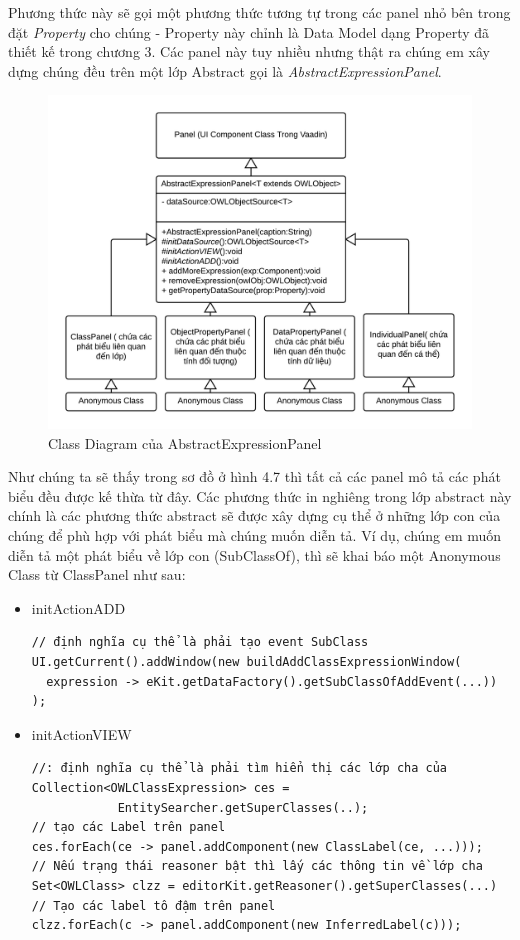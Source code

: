 Phương thức này sẽ gọi một phương thức tương tự trong các panel nhỏ bên trong đặt \textit{Property} cho chúng - Property này chỉnh là Data Model dạng Property đã thiết kế trong chương 3. Các panel này tuy nhiều nhưng thật ra chúng em xây dựng chúng đều trên một lớp Abstract gọi là \textit{AbstractExpressionPanel}.
\begin{figure}[h!]
	\centering
	\includegraphics[width=155mm]{Figures/uml_owleditor_abstractpanel_nobackground.png}
	\caption{Class Diagram của AbstractExpressionPanel\label{overflow}}
\end{figure}
Như chúng ta sẽ thấy trong sơ đồ ở hình 4.7 thì tất cả các panel mô tả các phát biểu đều được kế thừa từ đây. Các phương thức in nghiêng trong lớp abstract này chính là các phương thức abstract sẽ được xây dựng cụ thể ở những lớp con của chúng để phù hợp với phát biểu mà chúng muốn diễn tả. Ví dụ, chúng em muốn diễn tả một phát biểu về lớp con (SubClassOf), thì sẽ khai báo một Anonymous Class từ ClassPanel như sau:
\begin{itemize}
\item initActionADD
\begin{verbatim}
// định nghĩa cụ thể là phải tạo event SubClass
UI.getCurrent().addWindow(new buildAddClassExpressionWindow(
  expression -> eKit.getDataFactory().getSubClassOfAddEvent(...))
);
\end{verbatim}
\item initActionVIEW
\begin{verbatim}
//: định nghĩa cụ thể là phải tìm hiển thị các lớp cha của
Collection<OWLClassExpression> ces = 
            EntitySearcher.getSuperClasses(..);
// tạo các Label trên panel
ces.forEach(ce -> panel.addComponent(new ClassLabel(ce, ...)));
// Nếu trạng thái reasoner bật thì lấy các thông tin về lớp cha
Set<OWLClass> clzz = editorKit.getReasoner().getSuperClasses(...)
// Tạo các label tô đậm trên panel 
clzz.forEach(c -> panel.addComponent(new InferredLabel(c)));
\end{verbatim}
\end{itemize}
